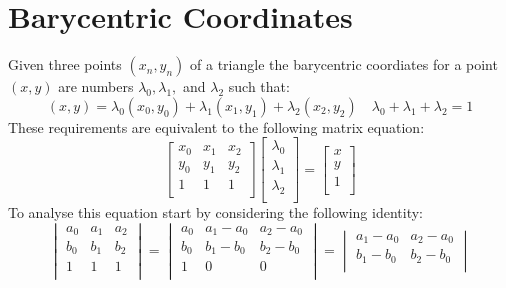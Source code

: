 
\section{Barycentric Coordinates}
\label{appx:bary}
\begin{center}
\end{center}
Given three points $(x_n,y_n)$ of a triangle the barycentric coordiates for a point $(x,y)$ are numbers $\lambda_0,\lambda_1,$ and $\lambda_2$ such that:
\[(x,y) = \lambda_0(x_0,y_0)+\lambda_1(x_1,y_1)+\lambda_2(x_2,y_2)\quad \lambda_0+\lambda_1+\lambda_2=1\]
These requirements are equivalent to the following matrix equation:
\[
\begin{bmatrix}
	x_0&x_1&x_2\\
	y_0&y_1&y_2\\
	1&1&1\\
\end{bmatrix}
\begin{bmatrix}
	\lambda_0\\\lambda_1\\\lambda_2\\
\end{bmatrix}
=
\begin{bmatrix}
	x\\y\\1\\
\end{bmatrix}
\]
To analyse this equation start by considering the following identity: 
\[
\begin{vmatrix}
	a_0&a_1&a_2\\
	b_0&b_1&b_2\\
	1&1&1\\
\end{vmatrix}
=
\begin{vmatrix}
	a_0&a_1-a_0&a_2-a_0\\
	b_0&b_1-b_0&b_2-b_0\\
	1&0&0\\
\end{vmatrix}
=
\begin{vmatrix}
	a_1-a_0&a_2-a_0\\
	b_1-b_0&b_2-b_0\\
\end{vmatrix}
\]

